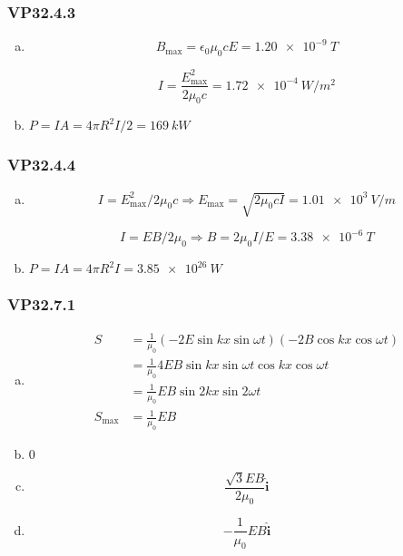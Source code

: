 \documentclass{article}
\begin{document}
\subsubsection{VP32.4.3}

\begin{enumerate}[(a)]
  \item

        \[B_\text{max} = \epsilon_0 \mu_0 c E = \qty{1.20e-9}{T}\]

        \[I = \frac{E_\text{max}^2}{2 \mu_0 c} = \qty{1.72e-4}{W/m^2}\]

  \item $P = I A = 4 \pi R^2 I / 2 = \qty{169}{kW}$
\end{enumerate}

\subsubsection{VP32.4.4}

\begin{enumerate}[(a)]
  \item

        \[I = E_\text{max}^2 / 2 \mu_0 c \Rightarrow E_\text{max} = \sqrt{2 \mu_0 c I} = \qty{1.01e3}{V/m}\]

        \[I = E B / 2 \mu_0 \Rightarrow B = 2 \mu_0 I / E = \qty{3.38e-6}{T}\]

  \item $P = I A = 4 \pi R^2 I = \qty{3.85e26}{W}$
\end{enumerate}

\subsubsection{VP32.7.1}

\begin{enumerate}[(a)]
  \item

        \begin{align*}
          S            & = \frac{1}{\mu_0} (-2 E \sin k x \sin \omega t)(-2 B \cos k x \cos \omega t) \\
                       & = \frac{1}{\mu_0} 4 E B \sin k x \sin \omega t \cos k x \cos \omega t        \\
                       & = \frac{1}{\mu_0} E B \sin 2 k x \sin 2 \omega t                             \\
          S_\text{max} & = \frac{1}{\mu_0} E B
        \end{align*}

  \item $0$

  \item \[\frac{\sqrt{3} E B}{2 \mu_0} \hat{\mathbf{i}}\]

  \item \[-\frac{1}{\mu_0} E B \hat{\mathbf{i}}\]
\end{enumerate}
\end{document}
